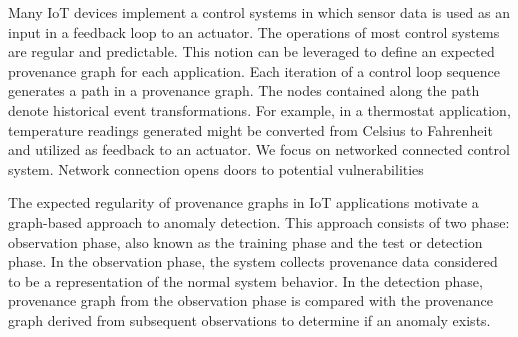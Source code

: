 Many IoT devices implement a control systems in which sensor data is used as an input in a feedback loop to an actuator. The operations of most control systems are regular and predictable. This notion can be leveraged to define an expected provenance graph for each application. Each iteration of a control loop sequence generates a path in a provenance graph. The nodes contained along the path denote historical event transformations. For example, in a thermostat application, temperature readings generated might be converted from Celsius to Fahrenheit and utilized as feedback to an actuator. We focus on networked connected control system. Network connection opens doors to potential vulnerabilities



 

\par The expected regularity of provenance graphs in IoT applications motivate a graph-based approach to anomaly detection. This approach consists of two phase: observation phase, also known as the training phase and the test or detection phase. In the observation phase, the system collects provenance data considered to be a representation of the normal system behavior. In the detection phase,  provenance graph from the observation phase is compared with the provenance graph derived from subsequent observations to determine if an anomaly exists. 




 




